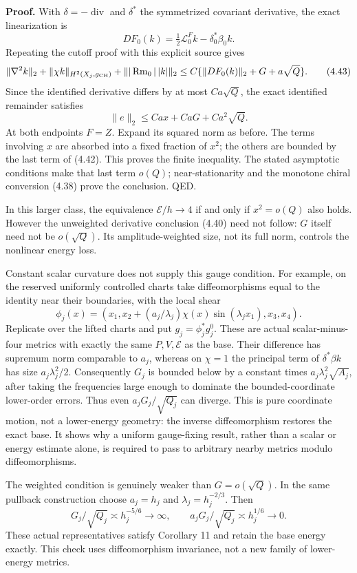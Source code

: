\documentclass[
  11pt,
]{article}
\begin{document}
\textbf{Proof.} With \(\delta=-\operatorname{div}\) and \(\delta^*\) the
symmetrized covariant derivative, the exact linearization is \[
 DF_0(k)=\tfrac12\mathcal L_0^Fk-\delta_0^*\beta_0k.
\] Repeating the cutoff proof with this explicit source gives \[
 \|\nabla^2k\|_2+\|\chi k\|_{H^2(X_j,g_{\rm CH})}
          +\||\operatorname{Rm}_0|\,|k|\|_2
 \le C\{\|DF_0(k)\|_2+G+a\sqrt Q\}. \tag{4.43}
\] Since the identified derivative differs by at most \(Ca\sqrt Q\), the
exact identified remainder satisfies \[
 \|e\|_2\le Ca x+CaG+Ca^2\sqrt Q.
\] At both endpoints \(F=Z\). Expand its squared norm as before. The
terms involving \(x\) are absorbed into a fixed fraction of \(x^2\); the
others are bounded by the last term of (4.42). This proves the finite
inequality. The stated asymptotic conditions make that last term
\(o(Q)\); near-stationarity and the monotone chiral conversion (4.38)
prove the conclusion. QED.

In this larger class, the equivalence \(\mathcal E/h\to4\) if and only
if \(x^2=o(Q)\) also holds. However the unweighted derivative conclusion
(4.40) need not follow: \(G\) itself need not be \(o(\sqrt Q)\). Its
amplitude-weighted size, not its full norm, controls the nonlinear
energy loss.

Constant scalar curvature does not supply this gauge condition. For
example, on the reserved uniformly controlled charts take
diffeomorphisms equal to the identity near their boundaries, with the
local shear \[
 \phi_j(x)=
 (x_1,x_2+(a_j/\lambda_j)\chi(x)\sin(\lambda_jx_1),x_3,x_4).
\] Replicate over the lifted charts and put \(g_j=\phi_j^*g_j^0\). These
are actual scalar-minus-four metrics with exactly the same
\(P,V,\mathcal E\) as the base. Their difference has supremum norm
comparable to \(a_j\), whereas on \(\chi=1\) the principal term of
\(\delta^*\beta k\) has size \(a_j\lambda_j^2/2\). Consequently \(G_j\)
is bounded below by a constant times \(a_j\lambda_j^2\sqrt{A_j}\), after
taking the frequencies large enough to dominate the bounded-coordinate
lower-order errors. Thus even \(a_jG_j/\sqrt{Q_j}\) can diverge. This is
pure coordinate motion, not a lower-energy geometry: the inverse
diffeomorphism restores the exact base. It shows why a uniform
gauge-fixing result, rather than a scalar or energy estimate alone, is
required to pass to arbitrary nearby metrics modulo diffeomorphisms.

The weighted condition is genuinely weaker than \(G=o(\sqrt Q)\). In the
same pullback construction choose \(a_j=h_j\) and
\(\lambda_j=h_j^{-2/3}\). Then \[
 G_j/\sqrt{Q_j}\asymp h_j^{-5/6}\longrightarrow\infty,\qquad
 a_jG_j/\sqrt{Q_j}\asymp h_j^{1/6}\longrightarrow0.
\] These actual representatives satisfy Corollary 11 and retain the base
energy exactly. This check uses diffeomorphism invariance, not a new
family of lower-energy metrics.
\end{document}
